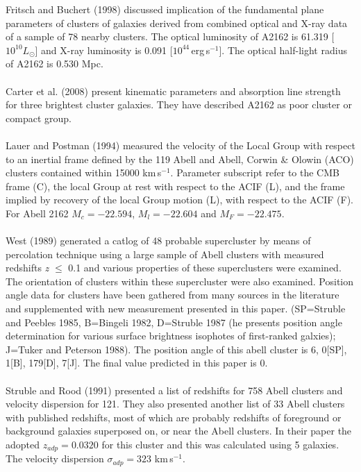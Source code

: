 Fritsch and Buchert (1998) discussed implication of the fundamental plane parameters of clusters of galaxies derived from combined optical and X-ray data of a sample of 78 nearby clusters. The optical luminosity of A2162 is 61.319 [$10^{10}L_\odot$] and X-ray luminosity is 0.091 [$10^{44}$\,erg\,s$^{-1}$]. The optical half-light radius of A2162 is 0.530 Mpc.\\\\
Carter et al. (2008) present kinematic parameters and absorption line strength for three brightest cluster galaxies. They have described A2162 as poor cluster or compact group.\\\\
Lauer and Postman (1994) measured the velocity of the Local Group with respect to an inertial frame defined by the 119 Abell and Abell, Corwin \& Olowin (ACO) clusters contained within 15000 km\,s$^{-1}$. Parameter subscript refer to the CMB frame (C), the local Group at rest with respect to the ACIF (L), and the frame implied by recovery of the local Group motion (L), with respect to the ACIF (F). For Abell 2162 $M_c=-22.594$, $M_l=-22.604$ and $M_F=-22.475$.\\\\
West (1989) generated a catlog of 48 probable supercluster  by means of percolation technique using a large sample of Abell clusters with measured redshifts \textit{z} $\leq$ 0.1 and various properties of these superclusters were examined. The orientation of clusters within these supercluster were also examined. Position angle data for clusters have been gathered from many sources in the literature and supplemented with new measurement presented in this paper. (SP=Struble and Peebles 1985, B=Bingeli 1982, D=Struble 1987 (he presents position angle determination for various surface brightness isophotes of first-ranked galxies); J=Tuker and Peterson 1988). The position angle of this abell cluster is 6, 0[SP], 1[B], 179[D], 7[J]. The final value predicted in this paper is 0.\\\\
Struble and Rood (1991) presented a list of redshifts for 758 Abell clusters and velocity dispersion for 121. They also presented another list of 33 Abell clusters with published redshifts, most of which are probably redshifts of foreground or background galaxies superposed on, or near the Abell clusters. In their paper the adopted $z_{adp}= 0.0320$ for this cluster and this was calculated using 5 galaxies. The velocity dispersion $\sigma_{adp}=323$ km\,s$^{-1}$.\\\\

